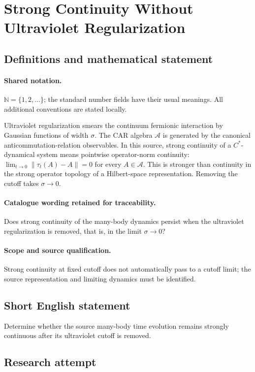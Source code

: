 \documentclass[11pt]{article}
\begin{document}
\section{Strong Continuity Without Ultraviolet Regularization}\label{statement}

\subsection{Definitions and mathematical statement}

\paragraph{Shared notation.}$\mathbb N=\{1,2,\ldots\}$; the standard number fields have their usual meanings. All additional conventions are stated locally.


Ultraviolet regularization smears the continuum fermionic interaction by Gaussian functions of width $\sigma$. The CAR algebra $\mathcal A$ is generated by the canonical anticommutation-relation observables. In this source, strong continuity of a $C^*$-dynamical system means pointwise operator-norm continuity: $\lim_{t\to0}\|\tau_t(A)-A\|=0$ for every $A\in\mathcal A$. This is stronger than continuity in the strong operator topology of a Hilbert-space representation. Removing the cutoff takes $\sigma\to0$.

\paragraph{Catalogue wording retained for traceability.}
Does strong continuity of the many-body dynamics persist when the ultraviolet regularization is removed, that is, in the limit $\sigma\to 0$?

\paragraph{Scope and source qualification.}Strong continuity at fixed cutoff does not automatically pass to a cutoff limit; the source representation and limiting dynamics must be identified.
\subsection{Short English statement}
Determine whether the source many-body time evolution remains strongly continuous after its ultraviolet cutoff is removed.
\subsection{Research attempt}
\end{document}
